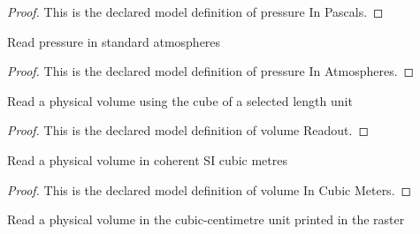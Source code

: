 \begin{proof}
  This is the declared model definition of pressure In Pascals.
\end{proof}
\begin{definition}
  \label{def:physics:phyx-mini-0426:phyxminiproblems-problemphyxmini0426-pressureinatmospheres}
  Read pressure in standard atmospheres
\end{definition}
\begin{proof}
  This is the declared model definition of pressure In Atmospheres.
\end{proof}
\begin{definition}
  \label{def:physics:phyx-mini-0426:phyxminiproblems-problemphyxmini0426-volumereadout}
  Read a physical volume using the cube of a selected length unit
\end{definition}
\begin{proof}
  This is the declared model definition of volume Readout.
\end{proof}
\begin{definition}
  \label{def:physics:phyx-mini-0426:phyxminiproblems-problemphyxmini0426-volumeincubicmeters}
  Read a physical volume in coherent SI cubic metres
\end{definition}
\begin{proof}
  This is the declared model definition of volume In Cubic Meters.
\end{proof}
\begin{definition}
  \label{def:physics:phyx-mini-0426:phyxminiproblems-problemphyxmini0426-volumeincubiccentimeters}
  Read a physical volume in the cubic-centimetre unit printed in the raster
\end{definition}
